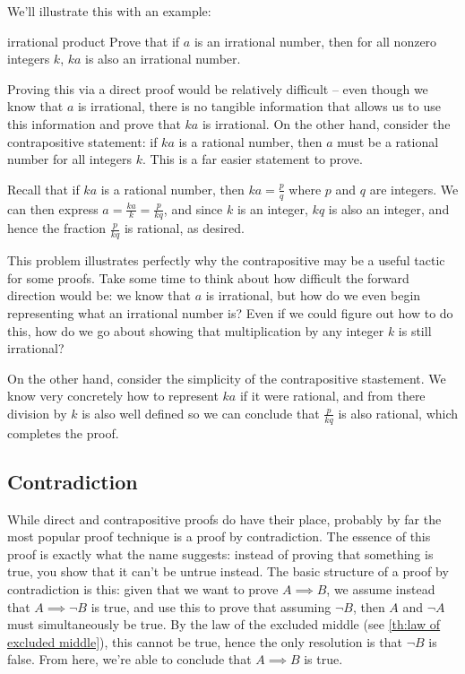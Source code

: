 We'll illustrate this with an example:

\begin{example}{}{irrational product}
	Prove that if  \( a \) is an irrational number, then for all nonzero integers
	 \( k \), \( ka \) is also an irrational number. 


	 Proving this via a direct proof would be relatively difficult -- even though we know that \( a  \) is irrational, 
	 there is no tangible information that allows us to use this information and prove that \( ka \) is irrational.  
	 On the other hand, consider the contrapositive statement: if \( ka \) is a rational number, then
	 \( a  \) must be a rational number for all integers \( k \). This is a far easier statement to prove. 

	 Recall that if \( ka \) is a rational number, then \( ka = \frac{p}{q} \) where \( p \) and \( q \) are 
	 integers. We can then express \( a = \frac{ka}{k} = \frac{p}{kq} \), and since \( k  \) is an integer, 
	 \( kq \) is also an integer, and hence the fraction \( \frac{p}{kq} \) is rational, as desired. 
\end{example}

This problem illustrates perfectly why the contrapositive may be a useful tactic for some proofs. Take some time to 
think about how difficult the forward direction would be: we know that \( a  \) is irrational, but how do we even 
begin representing what an irrational number is? Even if we could figure out how to do this, how do we go about 
showing that multiplication by any integer \( k \) is still irrational? 

On the other hand, consider the simplicity of the contrapositive stastement. We know very concretely how to represent 
\( ka \) if it were rational, and from there division by \( k \) is also well defined so we can conclude 
that \( \frac{p}{kq} \) is also rational, which completes the proof.
\subsection{Contradiction}
While direct and contrapositive proofs do have their place, probably by far the most popular proof technique 
is a proof by contradiction. The essence of this proof is exactly what the name suggests: instead of proving that 
something is true, you show that it can't be untrue instead. The basic structure of a proof by contradiction 
is this: given that we want to prove \( A \implies B \), we assume instead that \( A \implies \neg B \) is true, 
and use this to prove that assuming \( \neg B \), then \( A  \) and \( \neg A \) must simultaneously be true. By the 
law of the excluded middle (see \ref{th:law of excluded middle}), this cannot be true, hence the only resolution 
is that \( \neg B \) is false. From here, we're able to conclude that \( A \implies B \) is true. 

